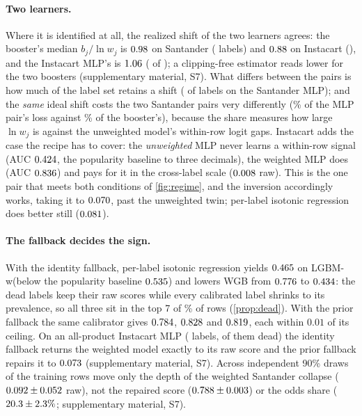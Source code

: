\documentclass[runningheads]{llncs}
\newcommand{\Sm}{\textsf{LGBM-w}\xspace}
\newcommand{\Wm}{\textsf{WGB}\xspace}
\newcommand{\Supp}[1]{supplementary material, #1}  %
\begin{document}
\paragraph{Two learners.} Where it is identified at all, the realized shift of the two learners agrees: the booster's median $b_j/\ln w_j$ is $0.98$ on Santander (\nSnIdentShift{} labels) and $0.88$ on Instacart (\nISnIdentShift), and the Instacart MLP's is $1.06$ (\nIMSnIdentShift{} of \nInLabels); a clipping-free estimator reads lower for the two boosters (\Supp{S7}). What differs between the pairs is how much of the label set retains a shift (\nMSnIdentShift{} of \nnLabels{} labels on the Santander MLP); and the \emph{same} ideal shift costs the two Santander pairs very differently (\nModdsShare\% of the MLP pair's loss against \noddsShare\% of the booster's), because the share measures how large $\ln w_j$ is against the unweighted model's within-row logit gaps. Instacart adds the case the recipe has to cover: the \emph{unweighted} MLP never learns a within-row signal (AUC $0.424$, the popularity baseline to three decimals), the weighted MLP does (AUC $0.836$) and pays for it in the cross-label scale ($0.008$ raw). This is the one pair that meets both conditions of \cref{fig:regime}, and the inversion accordingly works, taking it to $0.070$, past the unweighted twin; per-label isotonic regression does better still ($0.081$).

\paragraph{The fallback decides the sign.} With the identity fallback, per-label isotonic regression yields $0.465$ on \Sm (below the popularity baseline $0.535$) and lowers \Wm from $0.776$ to $0.434$: the \nSnDead{} dead labels keep their raw scores while every calibrated label shrinks to its prevalence, so all three sit in the top 7 of \nWdeadAllRowsPct\% of rows (\cref{prop:dead}). With the prior fallback the same calibrator gives $0.784$, $0.828$ and $0.819$, each within $0.01$ of its ceiling. On an all-product Instacart MLP (\nIMAnLabels{} labels, \nIMASnDead{} of them dead) the identity fallback returns the weighted model exactly to its raw score and the prior fallback repairs it to $0.073$ (\Supp{S7}). Across \nseedN{} independent 90\% draws of the training rows move only the depth of the weighted Santander collapse ($0.092 \pm 0.052$ raw), not the repaired score ($0.788 \pm 0.003$) or the odds share ($20.3 \pm 2.3\%$; \Supp{S7}).
\end{document}
